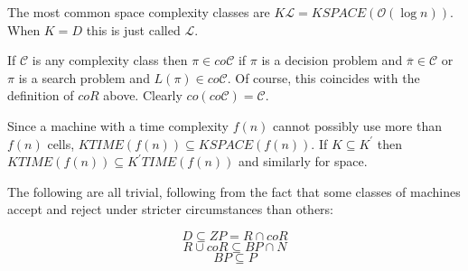 \documentclass[12pt]{article}
\begin{document}
The most common space complexity classes are $K\mathcal{L}=KSPACE(\mathcal{O}(\log n))$.  When $K=D$ this is just called $\mathcal{L}$.

If $\mathcal{C}$ is any complexity class then $\pi\in co\mathcal{C}$ if $\pi$ is a decision problem and $\overline{\pi}\in\mathcal{C}$ or $\pi$ is a search problem and $L(\pi)\in co\mathcal{C}$.  Of course, this coincides with the definition of $coR$ above.  Clearly $co(co\mathcal{C})=\mathcal{C}$.

Since a machine with a time complexity $f(n)$ cannot possibly use more than $f(n)$ cells, $KTIME(f(n))\subseteq KSPACE(f(n))$.  If $K\subseteq K^\prime$ then $KTIME(f(n))\subseteq K^\prime TIME(f(n))$ and similarly for space.

The following are all trivial, following from the fact that some classes of machines accept and reject under stricter circumstances than others:

$$D\subseteq ZP=R\cap coR$$
$$R\cup coR\subseteq BP\cap N$$
$$BP \subseteq P$$
\end{document}
